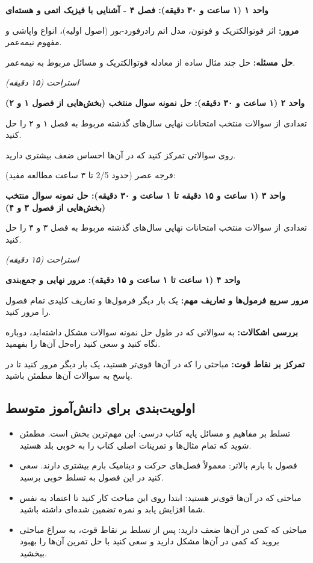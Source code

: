 \documentclass[12pt]{article}
\newcommand{\unithead}[1]{\par\vspace{1ex}\noindent\textbf{#1}\par\nopagebreak[4]\vspace{0.5ex}}
\newcommand{\休息}[1]{\par\centering\textit{#1}\par\vspace{1ex}} %
\begin{document}
\unithead{واحد ۱ (۱ ساعت و ۳۰ دقیقه): فصل ۴ - آشنایی با فیزیک اتمی و هسته‌ای}
\noindent\textbf{مرور: }اثر فوتوالکتریک و فوتون، مدل اتم رادرفورد-بور (اصول اولیه)، انواع واپاشی و مفهوم نیمه‌عمر.
\par\noindent\textbf{حل مسئله: }حل چند مثال ساده از معادله فوتوالکتریک و مسائل مربوط به نیمه‌عمر.

\休息{استراحت (۱۵ دقیقه)}

\unithead{واحد ۲ (۱ ساعت و ۳۰ دقیقه): حل نمونه سوال منتخب (بخش‌هایی از فصول ۱ و ۲)}
تعدادی از سوالات منتخب امتحانات نهایی سال‌های گذشته مربوط به فصل ۱ و ۲ را حل کنید.
\par روی سوالاتی تمرکز کنید که در آن‌ها احساس ضعف بیشتری دارید.

\vspace{1em}
فرجه عصر (حدود 2/5 تا ۳ ساعت مطالعه مفید):

\unithead{واحد ۳ (۱ ساعت و ۱۵ دقیقه تا ۱ ساعت و ۳۰ دقیقه): حل نمونه سوال منتخب (بخش‌هایی از فصول ۳ و ۴)}
تعدادی از سوالات منتخب امتحانات نهایی سال‌های گذشته مربوط به فصل ۳ و ۴ را حل کنید.

\休息{استراحت (۱۵ دقیقه)}

\unithead{واحد ۴ (۱ ساعت تا ۱ ساعت و ۱۵ دقیقه): مرور نهایی و جمع‌بندی}
\noindent\textbf{مرور سریع فرمول‌ها و تعاریف مهم: }یک بار دیگر فرمول‌ها و تعاریف کلیدی تمام فصول را مرور کنید.
\par\noindent\textbf{بررسی اشکالات: }به سوالاتی که در طول حل نمونه سوالات مشکل داشته‌اید، دوباره نگاه کنید و سعی کنید راه‌حل آن‌ها را بفهمید.
\par\noindent\textbf{تمرکز بر نقاط قوت: }مباحثی را که در آن‌ها قوی‌تر هستید، یک بار دیگر مرور کنید تا در پاسخ به سوالات آن‌ها مطمئن باشید.

\subsection*{اولویت‌بندی برای دانش‌آموز متوسط}
\begin{itemize}
    \item تسلط بر مفاهیم و مسائل پایه کتاب درسی: این مهم‌ترین بخش است. مطمئن شوید که تمام مثال‌ها و تمرینات اصلی کتاب را به خوبی بلد هستید.
    \item فصول با بارم بالاتر: معمولاً فصل‌های حرکت و دینامیک بارم بیشتری دارند. سعی کنید در این فصول به تسلط خوبی برسید.
    \item مباحثی که در آن‌ها قوی‌تر هستید: ابتدا روی این مباحث کار کنید تا اعتماد به نفس شما افزایش یابد و نمره تضمین شده‌ای داشته باشید.
    \item مباحثی که کمی در آن‌ها ضعف دارید: پس از تسلط بر نقاط قوت، به سراغ مباحثی بروید که کمی در آن‌ها مشکل دارید و سعی کنید با حل تمرین آن‌ها را بهبود ببخشید.
\end{itemize}
\end{document}
